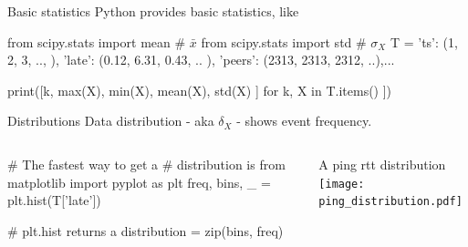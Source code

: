 \documentclass{beamer}[10]
\begin{document}

\begin{pyframe}{Basic statistics}
Python provides basic statistics, like
\begin{pycode}
from scipy.stats import mean	# $\bar{x}$
from scipy.stats import std	# $\sigma_{X}$
T = { 'ts': (1, 2, 3, .., ),
      'late': (0.12, 6.31, 0.43, .. ),
      'peers': (2313, 2313, 2312, ..),...}
      
print([k, max(X), min(X), mean(X), std(X) ]   
        for k, X in T.items() ])
\end{pycode}
\end{pyframe}



\begin{pyframe}{Distributions}
Data distribution - aka $\delta_{X}$ - shows event frequency.
\begin{columns}
\begin{pycode}
# The fastest way to get a 
#  distribution is
from matplotlib import pyplot as plt
freq, bins, _ = plt.hist(T['late'])

# plt.hist returns a
distribution = zip(bins, freq)
\end{pycode}
A ping rtt distribution
\texttt{[image: ping\_distribution.pdf]}
\end{columns}
\end{pyframe}
\end{document}
